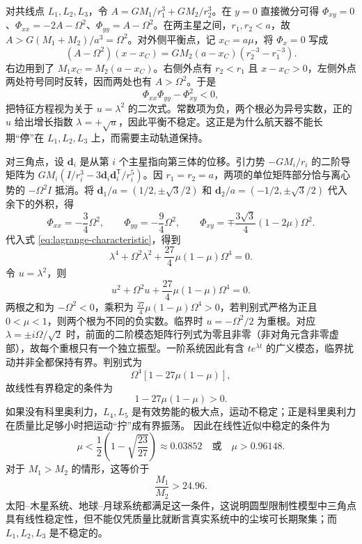 对共线点 $L_1,L_2,L_3$，令 $A=GM_1/r_1^3+GM_2/r_2^3$。在 $y=0$ 直接微分可得 $\Phi_{xy}=0$、$\Phi_{xx}=-2A-\Omega^2$、$\Phi_{yy}=A-\Omega^2$。在两主星之间，$r_1,r_2<a$，故 $A>G(M_1+M_2)/a^3=\Omega^2$。对外侧平衡点，记 $x_C=a\mu$，将 $\Phi_x=0$ 写成
\[
(A-\Omega^2)(x-x_C)
=G M_2(a-x_C)(r_2^{-3}-r_1^{-3}).
\]
右边用到了 $M_1x_C=M_2(a-x_C)$。右侧外点有 $r_2<r_1$ 且 $x-x_C>0$，左侧外点两处符号同时反转，因而两处也有 $A>\Omega^2$。于是
\begin{equation}
\Phi_{xx}\Phi_{yy}-\Phi_{xy}^2<0,
\end{equation}
把特征方程视为关于 $u=\lambda^2$ 的二次式。常数项为负，两个根必为异号实数，正的 $u$ 给出增长指数 $\lambda=+\sqrt u$，因此平衡不稳定。这正是为什么航天器不能长期“停”在 $L_1,L_2,L_3$ 上，而需要主动轨道保持。

对三角点，设 $\boldsymbol d_i$ 是从第 $i$ 个主星指向第三体的位移。引力势 $-GM_i/r_i$ 的二阶导矩阵为 $GM_i(I/r_i^3-3\boldsymbol d_i\boldsymbol d_i^{\mathsf T}/r_i^5)$。因 $r_1=r_2=a$，两项的单位矩阵部分恰与离心势的 $-\Omega^2I$ 抵消。将 $\boldsymbol d_1/a=(1/2,\pm\sqrt3/2)$ 和 $\boldsymbol d_2/a=(-1/2,\pm\sqrt3/2)$ 代入余下的外积，得
\begin{equation}
\Phi_{xx}=-\frac34\Omega^2,\qquad
\Phi_{yy}=-\frac94\Omega^2,\qquad
\Phi_{xy}=\mp\frac{3\sqrt3}{4}(1-2\mu)\Omega^2.
\end{equation}
代入式 \eqref{eq:lagrange-characteristic}，得到
\begin{equation}
\lambda^4+\Omega^2\lambda^2
+\frac{27}{4}\mu(1-\mu)\Omega^4=0.
\label{eq:L4-characteristic}
\end{equation}
令 $u=\lambda^2$，则
\begin{equation}
u^2+\Omega^2u+\frac{27}{4}\mu(1-\mu)\Omega^4=0.
\end{equation}
两根之和为 $-\Omega^2<0$，乘积为 $\frac{27}{4}\mu(1-\mu)\Omega^4>0$，若判别式严格为正且 $0<\mu<1$，则两个根为不同的负实数。临界时 $u=-\Omega^2/2$ 为重根。对应 $\lambda=\pm i\Omega/\sqrt2$ 时，前面的二阶模态矩阵行列式为零且非零（非对角元含非零虚部），故每个重根只有一个独立振型。一阶系统因此有含 $t e^{\lambda t}$ 的广义模态，临界扰动并非全都保持有界。判别式为
\begin{equation}
\Omega^4\left[1-27\mu(1-\mu)\right],
\end{equation}
故线性有界稳定的条件为
\begin{equation}
1-27\mu(1-\mu)>0.
\end{equation}
如果没有科里奥利力，$L_4,L_5$ 是有效势能的极大点，运动不稳定；正是科里奥利力在质量比足够小时把运动“拧”成有界振荡。
因此在线性近似中稳定的条件为
\begin{equation}
\mu<\frac12\left(1-\sqrt{\frac{23}{27}}\right)
\approx0.03852
\quad\text{或}\quad
\mu>0.96148 .
\end{equation}
对于 $M_1>M_2$ 的情形，这等价于
\begin{equation}
\frac{M_1}{M_2}>24.96 .
\end{equation}
太阳--木星系统、地球--月球系统都满足这一条件，这说明圆型限制性模型中三角点具有线性稳定性，但不能仅凭质量比就断言真实系统中的尘埃可长期聚集；而 $L_1,L_2,L_3$ 是不稳定的。

